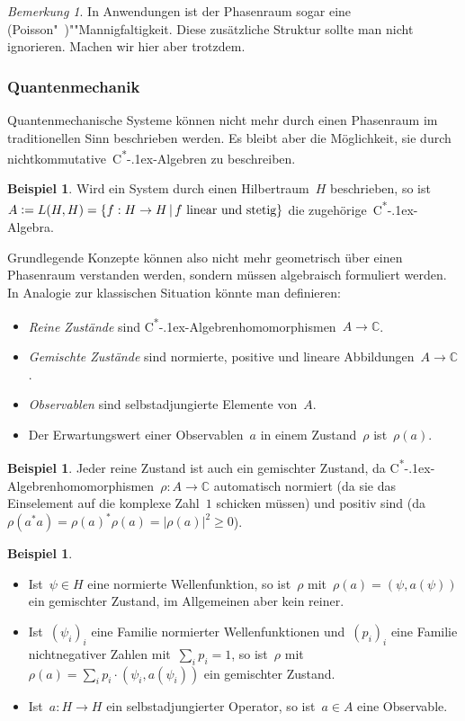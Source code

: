 \documentclass[a4paper,ngerman,12pt]{scrartcl}
\theoremstyle{definition}
\newtheorem{bsp}[defn]{Beispiel}
\theoremstyle{plain}
\theoremstyle{remark}
\newtheorem{bem}[defn]{Bemerkung}
\newcommand{\CC}{\mathbb{C}}
\newcommand{\csalgebra}{C\textsuperscript{*}\kern-.1ex-Algebra}
\newcommand{\csalgebren}{C\textsuperscript{*}\kern-.1ex-Alge\-bren}
\renewcommand{\_}{\mathpunct{.}\,}
\newcommand{\?}{\,{:}\,}
\newcommand{\defeq}{\vcentcolon=}
\begin{document}
\begin{bem}In Anwendungen ist der Phasenraum sogar eine
(Poisson"~)""Mannigfaltigkeit. Diese zusätzliche Struktur sollte man nicht
ignorieren. Machen wir hier aber trotzdem.\end{bem}


\subsubsection*{Quantenmechanik}

Quantenmechanische Systeme können nicht mehr durch einen Phasenraum im
traditionellen Sinn beschrieben werden. Es bleibt aber die Möglichkeit, sie
durch nichtkommutative~\csalgebren{} zu beschreiben.

\begin{bsp}Wird ein System durch einen Hilbertraum~$H$ beschrieben, so ist~$A
\defeq L(H,H) = \{ f : H \to H \,|\, \text{$f$ linear und stetig} \}$ die
zugehörige~\csalgebra.\end{bsp}

Grundlegende Konzepte können also nicht mehr geometrisch über einen Phasenraum
verstanden werden, sondern müssen algebraisch formuliert werden. In Analogie
zur klassischen Situation könnte man definieren:
\begin{itemize}
\item \emph{Reine Zustände} sind \csalgebren{}\-homo\-mor\-phis\-men~$A \to
\CC$.
\item \emph{Gemischte Zustände} sind normierte, positive und lineare
Abbildungen~$A \to \CC$.
\item \emph{Observablen} sind selbstadjungierte Elemente von~$A$.
\item Der Erwartungswert einer Observablen~$a$ in einem Zustand~$\rho$
ist~$\rho(a)$.
\end{itemize}

\begin{bsp}Jeder reine Zustand ist auch ein gemischter Zustand, da
\csalgebren{}\-homo\-mor\-phis\-men~$\rho : A \to \CC$ automatisch normiert (da sie das
Einselement auf die komplexe Zahl~$1$ schicken müssen) und positiv sind
(da~$\rho(a^* a) = \rho(a)^* \rho(a) = |\rho(a)|^2 \geq 0$).\end{bsp}

\begin{bsp}\begin{itemize}
\item Ist~$\psi \in H$ eine normierte Wellenfunktion, so ist~$\rho$
mit~$\rho(a) = (\psi, a(\psi))$ ein gemischter Zustand, im Allgemeinen aber
kein reiner.
\item Ist~$(\psi_i)_i$ eine Familie normierter Wellenfunktionen und~$(p_i)_i$
eine Familie nichtnegativer Zahlen mit~$\sum_i p_i = 1$, so ist~$\rho$
mit~$\rho(a) = \sum_i p_i \cdot (\psi_i, a(\psi_i))$ ein gemischter Zustand.
\item Ist~$a : H \to H$ ein selbstadjungierter Operator, so ist~$a \in A$ eine
Observable.
\end{itemize}
\end{bsp}
\end{document}

